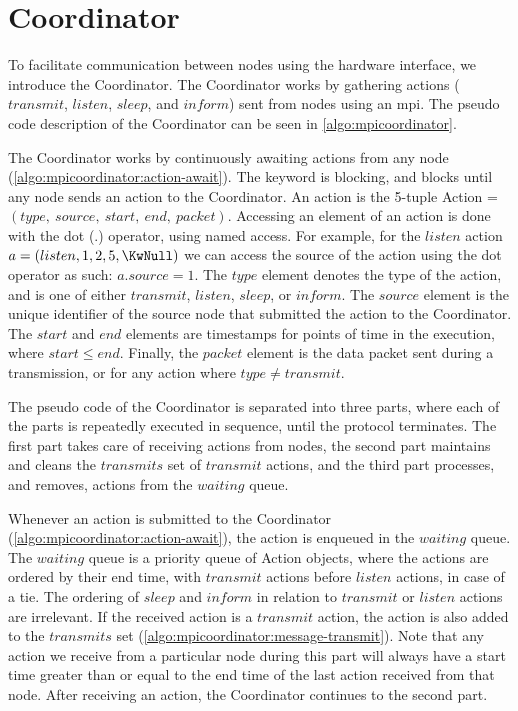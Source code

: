 \clearpage
\section{Coordinator}\label{sec:coordinator}
To facilitate communication between nodes using the hardware interface, we introduce the Coordinator. The Coordinator works by gathering actions ($transmit$, $listen$, $sleep$, and $inform$) sent from nodes using an \gls{mpi}. The pseudo code description of the Coordinator can be seen in \autoref{algo:mpicoordinator}. \smallbreak

The Coordinator works by continuously awaiting actions from any node (\autoref{algo:mpicoordinator:action-await}). The \KwAwait keyword is blocking, and blocks until any node sends an action to the Coordinator. An action is the 5-tuple Action = $(type,\ source,\ start,\ end,\ packet)$. Accessing an element of an action is done with the dot ($.$) operator, using named access. For example, for the $listen$ action $a = (listen, 1, 2, 5, \KwNull)$ we can access the source of the action using the dot operator as such: $a.source = 1$. The $type$ element denotes the type of the action, and is one of either $transmit$, $listen$, $sleep$, or $inform$. The $source$ element is the unique identifier of the source node that submitted the action to the Coordinator. The $start$ and $end$ elements are timestamps for points of time in the execution, where $start \leq end$. Finally, the $packet$ element is the data packet sent during a transmission, or \KwNull for any action where $type \neq transmit$. \smallbreak

The pseudo code of the Coordinator is separated into three parts, where each of the parts is repeatedly executed in sequence, until the protocol terminates. The first part takes care of receiving actions from nodes, the second part maintains and cleans the $transmits$ set of $transmit$ actions, and the third part processes, and removes, actions from the $waiting$ queue. \smallbreak

Whenever an action is submitted to the Coordinator (\autoref{algo:mpicoordinator:action-await}), the action is enqueued in the $waiting$ queue. The $waiting$ queue is a priority queue of Action objects, where the actions are ordered by their end time, with $transmit$ actions before $listen$ actions, in case of a tie. The ordering of $sleep$ and $inform$ in relation to $transmit$ or $listen$ actions are irrelevant. If the received action is a $transmit$ action, the action is also added to the $transmits$ set (\autoref{algo:mpicoordinator:message-transmit}). Note that any action we receive from a particular node during this part will always have a start time greater than or equal to the end time of the last action received from that node. After receiving an action, the Coordinator continues to the second part. \smallbreak

